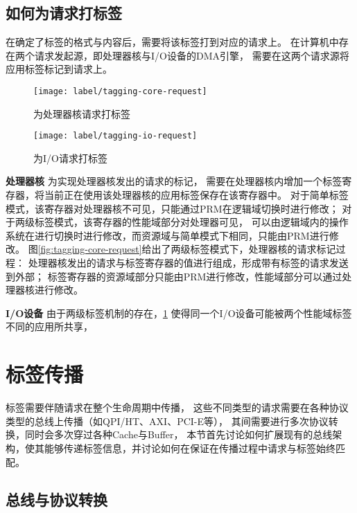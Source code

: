 \subsection{如何为请求打标签}
在确定了标签的格式与内容后，需要将该标签打到对应的请求上。
在计算机中存在两个请求发起源，即处理器核与I/O设备的DMA引擎，
需要在这两个请求源将应用标签标记到请求上。

\begin{figure}[b]
\begin{minipage}{0.48\textwidth}
  \centering
  \texttt{[image: label/tagging-core-request]}
  \caption{为处理器核请求打标签}
  \label{fig:tagging-core-request}
\end{minipage}\hfill
\begin{minipage}{0.48\textwidth}
  \centering
  \texttt{[image: label/tagging-io-request]}
  \caption{为I/O请求打标签}
  \label{fig:tagging-io-request}
\end{minipage}
\end{figure}

\textbf{处理器核} 为实现处理器核发出的请求的标记，
需要在处理器核内增加一个标签寄存器，将当前正在使用该处理器核的应用标签保存在该寄存器中。
对于简单标签模式，该寄存器对处理器核不可见，只能通过PRM在逻辑域切换时进行修改；
对于两级标签模式，该寄存器的性能域部分对处理器可见，
可以由逻辑域内的操作系统在进行切换时进行修改，而资源域与简单模式下相同，只能由PRM进行修改。
图\ref{fig:tagging-core-request}给出了两级标签模式下，处理器核的请求标记过程：
处理器核发出的请求与标签寄存器的值进行组成，形成带有标签的请求发送到外部；
标签寄存器的资源域部分只能由PRM进行修改，性能域部分可以通过处理器核进行修改。

\textbf{I/O设备} 由于两级标签机制的存在，\ref{fig:tagging-io-request}
使得同一个I/O设备可能被两个性能域标签不同的应用所共享，


\section{标签传播}

标签需要伴随请求在整个生命周期中传播，
这些不同类型的请求需要在各种协议类型的总线上传播（如QPI/HT、AXI、PCI-E等），
其间需要进行多次协议转换，同时会多次穿过各种Cache与Buffer，
本节首先讨论如何扩展现有的总线架构，使其能够传递标签信息，并讨论如何在保证在传播过程中请求与标签始终匹配。

\subsection{总线与协议转换}

